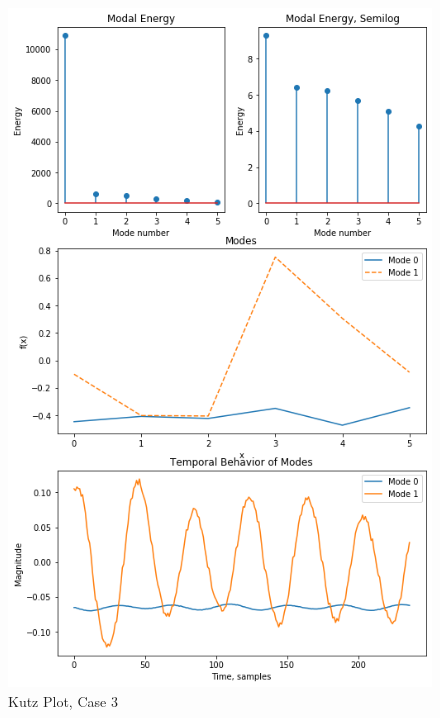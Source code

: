 \documentclass[journal]{IEEEtran}
\begin{document}
\begin{figure}
	\centerline{\includegraphics[width=\columnwidth]{kutz3.png}}
	\caption{Kutz Plot, Case 3}
	\label{kutz3}
\end{figure}
\end{document}
